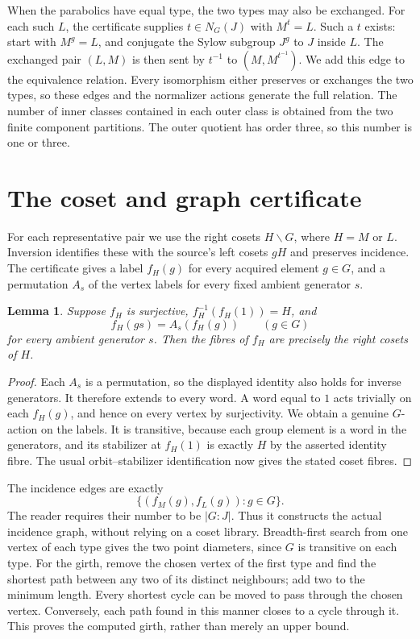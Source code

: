 \documentclass[11pt]{article}
\newtheorem{lemma}[theorem]{Lemma}
\begin{document}
When the parabolics have equal type, the two types may also be exchanged.
For each such $L$, the certificate supplies $t\in N_G(J)$ with $M^t=L$.
Such a $t$ exists: start with $M^g=L$, and conjugate the Sylow subgroup
$J^g$ to $J$ inside $L$. The exchanged pair $(L,M)$ is then sent by
$t^{-1}$ to $(M,M^{t^{-1}})$. We add this edge to the equivalence relation.
Every isomorphism either preserves or exchanges the two types, so these
edges and the normalizer actions generate the full relation. The number
of inner classes contained in each outer class is obtained from the two
finite component partitions. The outer quotient has order three, so this
number is one or three.

\section{The coset and graph certificate}
For each representative pair we use the right cosets $H\backslash G$,
where $H=M$ or $L$. Inversion identifies these with the source's left
cosets $gH$ and preserves incidence. The certificate gives a label $f_H(g)$
for every acquired element $g\in G$, and a permutation $A_s$ of the
vertex labels for every fixed ambient generator $s$.

\begin{lemma}\label{lem:cosets}
Suppose $f_H$ is surjective, $f_H^{-1}(f_H(1))=H$, and
\[
 f_H(gs)=A_s(f_H(g))\qquad(g\in G)
\]
for every ambient generator $s$. Then the fibres of $f_H$ are precisely
the right cosets of $H$.
\end{lemma}
\begin{proof}
Each $A_s$ is a permutation, so the displayed identity also holds for
inverse generators. It therefore extends to every word. A word equal to
$1$ acts trivially on each $f_H(g)$, and hence on every vertex by
surjectivity. We obtain a genuine $G$-action on the labels. It is transitive,
because each group element is a word in the generators, and its stabilizer
at $f_H(1)$ is exactly $H$ by the asserted identity fibre. The usual
orbit--stabilizer identification now gives the stated coset fibres.
\end{proof}

The incidence edges are exactly
\[
             \{(f_M(g),f_L(g)):g\in G\}.
\]
The reader requires their number to be $|G:J|$. Thus it constructs the
actual incidence graph, without relying on a coset library. Breadth-first
search from one vertex of each type gives the two point diameters, since
$G$ is transitive on each type. For the girth, remove the chosen vertex
of the first type and find the shortest path between any two of its
distinct neighbours; add two to the minimum length. Every shortest cycle
can be moved to pass through the chosen vertex. Conversely, each path
found in this manner closes to a cycle through it. This proves the
computed girth, rather than merely an upper bound.
\end{document}

